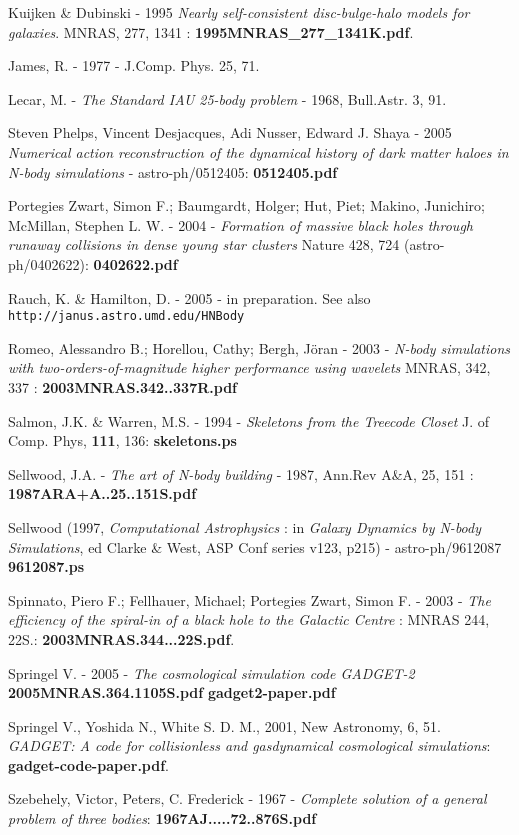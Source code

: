 Kuijken \& Dubinski - 1995 {\it Nearly self-consistent disc-bulge-halo models for galaxies}.
MNRAS, 277, 1341 : {\bf 1995MNRAS\_277\_1341K.pdf}.

James, R. - 1977 -  J.Comp. Phys. 25, 71.

Lecar, M. - {\it The Standard IAU 25-body problem} - 1968, Bull.Astr. 3, 91. 

Steven Phelps, Vincent Desjacques, Adi Nusser, Edward J. Shaya - 2005
{\it Numerical action reconstruction of the dynamical history of dark matter haloes in N-body simulations} -
astro-ph/0512405:   {\bf 0512405.pdf}

Portegies Zwart, Simon F.; Baumgardt, Holger; Hut, Piet; Makino, Junichiro; McMillan, Stephen L. W. -
2004 - {\it Formation of massive black holes through runaway collisions in dense young star clusters}
Nature 428, 724 (astro-ph/0402622): {\bf 0402622.pdf}

Rauch, K. \& Hamilton, D. - 2005 - in preparation. See also
{\tt http://janus.astro.umd.edu/HNBody}


Romeo, Alessandro B.; Horellou, Cathy; Bergh, Jöran - 2003 - 
{\it N-body simulations with two-orders-of-magnitude higher performance using wavelets}
MNRAS, 342, 337 : {\bf 2003MNRAS.342..337R.pdf}

Salmon, J.K. \& Warren, M.S. - 1994 -
{\it Skeletons from the Treecode Closet} J. of Comp. Phys, {\bf 111}, 136:
{\bf skeletons.ps}

Sellwood, J.A. - {\it The art of N-body building} - 1987, Ann.Rev A\&A, 25, 151 : 
{\bf 1987ARA+A..25..151S.pdf}


Sellwood (1997, {\it Computational Astrophysics} :
in {\it Galaxy Dynamics by N-body Simulations},
ed Clarke \& West,  ASP  Conf  series  v123, p215) - astro-ph/9612087
{\bf 9612087.ps}

Spinnato, Piero F.; Fellhauer, Michael; Portegies Zwart, Simon F. - 2003 -
{\it The efficiency of the spiral-in of a black hole to the Galactic Centre} :
MNRAS 244, 22S.: {\bf 2003MNRAS.344...22S.pdf}.

Springel V. - 2005 -
{\it The cosmological simulation code GADGET-2}
{\bf 2005MNRAS.364.1105S.pdf} {\bf gadget2-paper.pdf}

Springel V., Yoshida N., White S. D. M., 2001, New Astronomy, 6, 51. 
{\it GADGET: A code for collisionless and gasdynamical cosmological simulations}:
{\bf gadget-code-paper.pdf}.

Szebehely, Victor, Peters, C. Frederick - 1967 - 
{\it Complete solution of a general problem of three bodies}:
{\bf 1967AJ.....72..876S.pdf}

